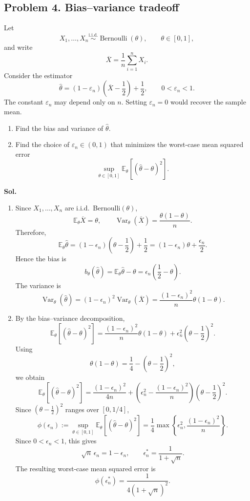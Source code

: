 \documentclass[lang=en,11pt,a4paper,citestyle=authoryear]{elegantpaper}
\newcommand{\E}{\mathbb{E}}
\begin{document}
\vspace{1em}

\subsection*{Problem 4. Bias--variance tradeoff}
Let
\[
X_1,\ldots,X_n\overset{\mathrm{i.i.d.}}{\sim}\operatorname{Bernoulli}(\theta),
\qquad \theta\in[0,1],
\]
and write
\[
\overline X=\frac{1}{n}\sum_{i=1}^n X_i.
\]
Consider the estimator
\[
\widehat\theta
=(1-\varepsilon_n)\left(\overline X-\frac12\right)+\frac12,
\qquad 0<\varepsilon_n<1.
\]
The constant $\varepsilon_n$ may depend only on $n$. Setting
$\varepsilon_n=0$ would recover the sample mean.

\begin{enumerate}[label=(\arabic*),leftmargin=*]
\item Find the bias and variance of $\widehat\theta$.

\item Find the choice of $\varepsilon_n\in(0,1)$ that minimizes the
worst-case mean squared error
\[
\sup_{\theta\in[0,1]}
\E_\theta\!\left[(\widehat\theta-\theta)^2\right].
\]
\end{enumerate}
\vspace{1em}
\textbf{Sol.}\par
\begin{enumerate}[label=(\arabic*),leftmargin=*]
\item Since $X_1,\ldots,X_n$ are i.i.d.\ Bernoulli$(\theta)$,
\[
\E_\theta\overline X=\theta,
\qquad
\operatorname{Var}_\theta(\overline X)
=\frac{\theta(1-\theta)}{n}.
\]
Therefore,
\[
\E_\theta\widehat\theta
=(1-\epsilon_n)\left(\theta-\frac12\right)+\frac12
=(1-\epsilon_n)\theta+\frac{\epsilon_n}{2}.
\]
Hence the bias is
\[
b_\theta(\widehat\theta)
=\E_\theta\widehat\theta-\theta
=\epsilon_n\left(\frac12-\theta\right).
\]
The variance is
\[
\operatorname{Var}_\theta(\widehat\theta)
=(1-\epsilon_n)^2
\operatorname{Var}_\theta(\overline X)
=\frac{(1-\epsilon_n)^2}{n}\theta(1-\theta).
\]

\item By the bias--variance decomposition,
\[
\E_\theta[(\widehat\theta-\theta)^2]
=
\frac{(1-\epsilon_n)^2}{n}\theta(1-\theta)
+\epsilon_n^2\left(\theta-\frac12\right)^2.
\]
Using
\[
\theta(1-\theta)
=\frac14-\left(\theta-\frac12\right)^2,
\]
we obtain
\[
\E_\theta[(\widehat\theta-\theta)^2]
=
\frac{(1-\epsilon_n)^2}{4n}
+
\left(
\epsilon_n^2-\frac{(1-\epsilon_n)^2}{n}
\right)
\left(\theta-\frac12\right)^2.
\]
Since $(\theta-\frac12)^2$ ranges over $[0,1/4]$,
\[
\phi(\epsilon_n)
:=
\sup_{\theta\in[0,1]}
\E_\theta[(\widehat\theta-\theta)^2]
=
\frac14\max\left\{
\epsilon_n^2,\frac{(1-\epsilon_n)^2}{n}
\right\}.
\]
Since $0<\epsilon_n<1$, this gives
\[
\sqrt n\,\epsilon_n=1-\epsilon_n,
\qquad
\epsilon_n^\ast=\frac{1}{1+\sqrt n}.
\]
The resulting worst-case mean squared error is
\[
\phi(\epsilon_n^\ast)
=\frac{1}{4(1+\sqrt n)^2}
.
\]
\end{enumerate}
\end{document}
